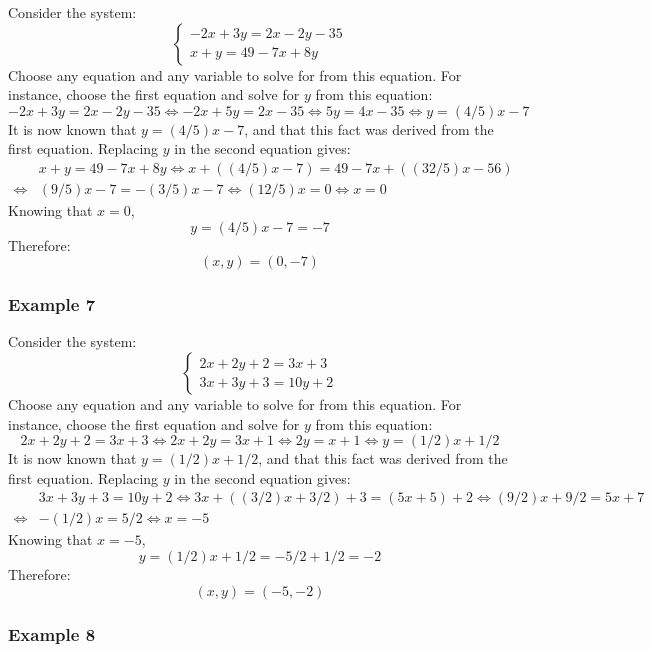 \documentclass{article}
\begin{document}
Consider the system:
\[\left\{\begin{array}{c} 
-2x + 3y = 2x - 2y - 35 \\
x + y = 49 - 7x + 8y
\end{array}\right.\] 
Choose any equation and any variable to solve for from this equation. For instance, choose the first equation and solve for \(y\) from this equation:
\[-2x + 3y = 2x - 2y - 35 \iff -2x + 5y = 2x - 35 \iff 5y = 4x - 35 \iff y = (4/5)x - 7\]
It is now known that \(y = (4/5)x - 7\), and that this fact was derived from the first equation. Replacing \(y\) in the second equation gives:
\begin{align*}
& x + y = 49 - 7x + 8y 
\iff x + ((4/5)x - 7) = 49 - 7x + ((32/5)x - 56) \\
\iff & (9/5)x - 7 = -(3/5)x - 7 
\iff (12/5)x = 0 
\iff x = 0
\end{align*}
Knowing that \(x = 0\), 
\[y = (4/5)x - 7 = -7\]
Therefore:
\[(x, y) = (0, -7)\]


\subsubsection*{Example 7}

Consider the system:
\[\left\{\begin{array}{c} 
2x + 2y + 2 = 3x + 3 \\
3x + 3y + 3 = 10y + 2
\end{array}\right.\] 
Choose any equation and any variable to solve for from this equation. For instance, choose the first equation and solve for \(y\) from this equation: 
\[2x + 2y + 2 = 3x + 3 \iff 2x + 2y = 3x + 1 \iff 2y = x + 1 \iff y = (1/2)x + 1/2\]
It is now known that \(y = (1/2)x + 1/2\), and that this fact was derived from the first equation. Replacing \(y\) in the second equation gives:
\begin{align*}
& 3x + 3y + 3 = 10y + 2 
\iff 3x + ((3/2)x + 3/2) + 3 = (5x + 5) + 2 
\iff (9/2)x + 9/2 = 5x + 7 \\
\iff & -(1/2)x = 5/2 
\iff x = -5
\end{align*}
Knowing that \(x = -5\), 
\[y = (1/2)x + 1/2 = -5/2 + 1/2 = -2\]
Therefore:
\[(x, y) = (-5, -2)\]


\subsubsection*{Example 8}
\end{document}
